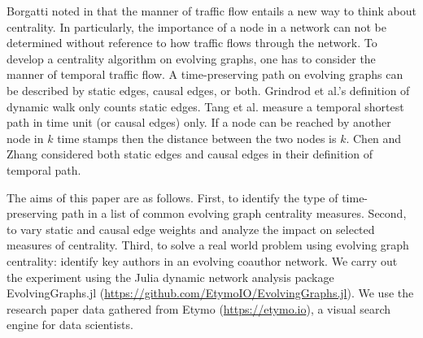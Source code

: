 \documentclass[12pt]{article}
\theoremstyle{definition}
\begin{document}


Borgatti noted in \cite{borgatti05} that the manner of traffic flow entails a new way to think about centrality. In particularly, the importance of a node in a network can not be determined without reference to how traffic flows through the network.
To develop a centrality algorithm on evolving graphs, one has to consider the manner of temporal traffic flow.
A time-preserving path on evolving graphs can be described by static edges, causal edges, or both.
Grindrod et al.'s definition of dynamic walk \cite{grindrod11} only counts static edges.
Tang et al. \cite{tang10s} measure a temporal shortest path in time unit (or causal edges) only. If a node can be reached by another node in $k$ time stamps then the distance between the two nodes is $k$. Chen and Zhang \cite{chen16} considered both static edges and causal edges in their definition of temporal path.


The aims of this paper are as follows. First, to identify the type of time-preserving path in a list of common evolving graph centrality measures. Second, to vary static and causal edge weights and analyze the impact on selected measures of centrality.
Third, to solve a real world problem using evolving graph centrality: identify key authors in an evolving coauthor network.
We carry out the experiment using the Julia dynamic network analysis package
EvolvingGraphs.jl (\url{https://github.com/EtymoIO/EvolvingGraphs.jl}).
We use the research paper data gathered from Etymo (\url{https://etymo.io}), a visual search engine for data scientists.
\end{document}
